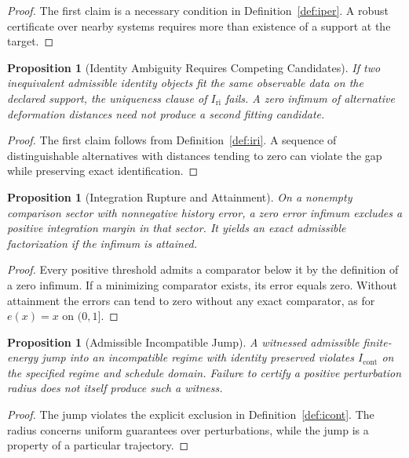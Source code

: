 \documentclass[11pt,a4paper]{article}
\newtheorem{proposition}[theorem]{Proposition}
\theoremstyle{definition}
\newcommand{\Iri}{I_{\mathrm{ri}}}
\newcommand{\Icont}{I_{\mathrm{cont}}}
\begin{document}
\begin{proof}
The first claim is a necessary condition in Definition~\ref{def:iper}. A robust certificate over nearby systems requires more than existence of a support at the target.
\end{proof}

\begin{proposition}[Identity Ambiguity Requires Competing Candidates]\label{prop:rupt-ri}
If two inequivalent admissible identity objects fit the same observable data on the declared support, the uniqueness clause of $\Iri$ fails. A zero infimum of alternative deformation distances need not produce a second fitting candidate.
\end{proposition}

\begin{proof}
The first claim follows from Definition~\ref{def:iri}. A sequence of distinguishable alternatives with distances tending to zero can violate the gap while preserving exact identification.
\end{proof}

\begin{proposition}[Integration Rupture and Attainment]\label{prop:rupt-int}
On a nonempty comparison sector with nonnegative history error, a zero error infimum excludes a positive integration margin in that sector. It yields an exact admissible factorization if the infimum is attained.
\end{proposition}

\begin{proof}
Every positive threshold admits a comparator below it by the definition of a zero infimum. If a minimizing comparator exists, its error equals zero. Without attainment the errors can tend to zero without any exact comparator, as for $e(x)=x$ on $(0,1]$.
\end{proof}

\begin{proposition}[Admissible Incompatible Jump]\label{prop:rupt-cont}
A witnessed admissible finite-energy jump into an incompatible regime with identity preserved violates $\Icont$ on the specified regime and schedule domain. Failure to certify a positive perturbation radius does not itself produce such a witness.
\end{proposition}

\begin{proof}
The jump violates the explicit exclusion in Definition~\ref{def:icont}. The radius concerns uniform guarantees over perturbations, while the jump is a property of a particular trajectory.
\end{proof}
\end{document}
